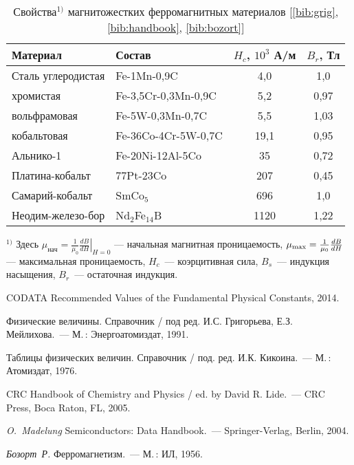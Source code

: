 \begin{booksupplement}
\begin{table}
\caption{Свойства$^{1)}$ магнитожестких ферромагнитных материалов
[\ref{bib:grig}, \ref{bib:handbook}, \ref{bib:bozort}]}
\centering\small
 \begin{tabular}{p{3.2cm}lcc}
 \toprule[1pt]
Материал & Состав & $H_c$, $10^3$ А/м & $B_r$, Тл \\
\midrule[1pt]
Сталь углеродистая & Fe-1Mn-0,9C & 4,0 & 1,0 \\
\quad хромистая & Fe-3,5Cr-0,3Mn-0,9C & 5,2 & 0,97 \\
\quad вольфрамовая & Fe-5W-0,3Mn-0,7C & 5,5 & 1,03 \\
\quad кобальтовая & Fe-36Co-4Cr-5W-0,7C & 19,1 & 0,95 \\
Альнико-1 & Fe-20Ni-12Al-5Co & 35 & 0,72 \\
Платина-кобальт & 77Pt-23Co & 207 & 0,45 \\
Самарий-кобальт & SmCo$_5$ & 696 & 1,0 \\
Неодим-железо-бор & Nd$_2$Fe$_{14}$B & 1120 & 1,22 \\
\bottomrule
 \end{tabular}\par
\bigskip
\raggedright\noindent
$^{1)}$ Здесь $\mu_{нач}=\frac{1}{\mu_0}\left.\frac{dB}{dH}\right|_{H=0}$ --- начальная
магнитная проницаемость,
$\mu_{\rm max}=\frac{1}{\mu_0}\frac{dB}{dH}$ --- максимальная
проницаемость, $H_c$~--- коэрцитивная сила, $B_s$~--- индукция насыщения,
$B_r$~--- остаточная индукция.
\end{table}

\clearpage

\begin{lab:literature}
 \item \label{bib:codata} CODATA Recommended Values of the Fundamental Physical Constants, 2014.
 \item \label{bib:grig} Физические величины. Справочник /
    под ред. И.С. Григорьева, Е.З. Мейлихова.~--- М.\,: Энергоатомиздат, 1991.
 \item \label{bib:kikoin} Таблицы физических величин. Справочник /
    под. ред. И.К. Кикоина.~--- М.\,: Атомиздат, 1976.
 \item \label{bib:handbook} CRC Handbook of Chemistry and Physics / ed. by David R. Lide.~---
 CRC Press, Boca Raton, FL, 2005.
 \item \label{bib:semi} \textit{O.~Madelung} Semiconductors: Data Handbook.~---
 Springer-Verlag, Berlin, 2004.
 \item \label{bib:bozort} \textit{Бозорт~Р.} Ферромагнетизм.~--- М.\,: ИЛ, 1956.
\end{lab:literature}

\end{booksupplement}
